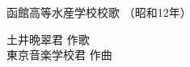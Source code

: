 \documentclass[10pt,b5j]{tarticle} %
\begin{document}
\begin{minipage}[c]{0.7\hsize} %
    \begin{center}
        {\LARGE
            函館高等水産学校校歌 %
        }
        {\small 
            （昭和12年） %
        }
    \end{center}
\end{minipage}
\begin{minipage}[c]{0.3\hsize} %
    \begin{flushright} %
        土井晩翠君 作歌\\東京音楽学校君 作曲 %
    \end{flushright}
\end{minipage}
\end{document}
